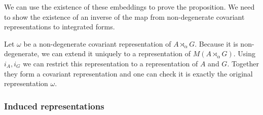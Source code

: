 We can use the existence of these embeddings to prove the proposition. We need to show the existence of an inverse of the map from non-degenerate covariant representations to integrated forms.

Let $\omega$ be a non-degenerate covariant representation of $A\rtimes_\alpha G$. Because it is non-degenerate, we can extend it uniquely to a representation of $M(A\rtimes_\alpha G)$. Using $i_A, i_G$ we can restrict this representation to a representation of $A$ and $G$. Together they form a covariant representation and one can check it is exactly the original representation $\omega$.

\subsubsection{Induced representations}